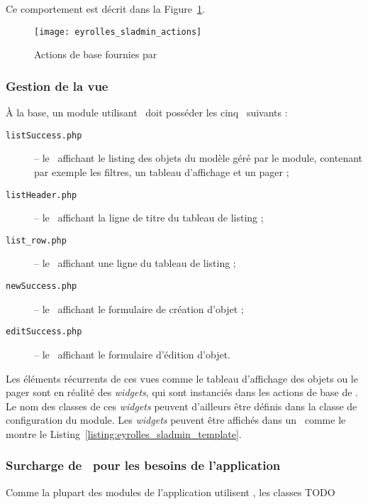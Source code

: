 Ce comportement est décrit dans la Figure~\ref{figure:eyrolles_sladmin_actions}.

\begin{figure}
	\centering
	\texttt{[image: eyrolles\_sladmin\_actions]}
	\caption{Actions de base fournies par \asladmin}
	\label{figure:eyrolles_sladmin_actions}
\end{figure}


\subsubsection{Gestion de la vue}
\label{section:eyrolles_sladmin_view}

À la base, un module utilisant \asladmin\ doit posséder les cinq \atemplates\ suivants :
\begin{description}
	\item[\texttt{listSuccess.php}] -- le \atemplate\ affichant le listing des objets du modèle géré par le module, contenant par exemple les filtres, un tableau d'affichage et un pager ;
	\item[\texttt{listHeader.php}] -- le \apartial\ affichant la ligne de titre du tableau de listing ;
	\item[\texttt{list\_row.php}] -- le \apartial\ affichant une ligne du tableau de listing ;
	\item[\texttt{newSuccess.php}] -- le \atemplate\ affichant le formulaire de création d'objet ;
	\item[\texttt{editSuccess.php}] -- le \atemplate\ affichant le formulaire d'édition d'objet.
\end{description}

Les éléments récurrents de ces vues comme le tableau d'affichage des objets ou le pager sont en réalité des \textit{widgets}, qui sont instanciés dans les actions de base de \asladmin. Le nom des classes de ces \textit{widgets} peuvent d'ailleurs être définis dans la classe de configuration du module. Les \textit{widgets} peuvent être affichés dans un \atemplate\ comme le montre le Listing~\ref{listing:eyrolles_sladmin_template}.




\subsubsection{Surcharge de \asladmin\ pour les besoins de l'application}

Comme la plupart des modules de l'application utilisent \asladmin, les classes TODO